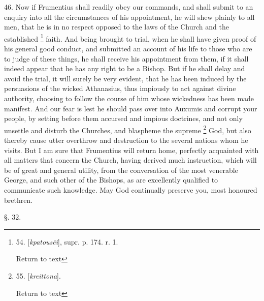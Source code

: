 46. Now if Frumentius shall readily obey our commands, and shall submit
to an enquiry into all the circumstances of his appointment, he will
shew plainly to all men, that he is in no respect opposed to the laws
of the Church and the established \footnote{54. [\emph{kpatous\={e}i}],
supr. p. 174. r. 1.

Return to text} faith. And being brought to trial, when he shall have given
proof of his general good conduct, and submitted an account of his
life to those who are to judge of these things, he shall receive his
appointment from them, if it shall indeed appear that he has any right
to be a Bishop. But if he shall delay and avoid the trial, it will
surely be very evident, that he has been induced by the persuasions of
the wicked Athanasius, thus impiously to act against divine authority,
choosing to follow the course of him whose wickedness has been made
manifest. And our fear is lest he should pass over into Auxumis and
corrupt your people, by setting before them accursed and impious
doctrines, and not only unsettle and disturb the Churches, and
blaspheme the supreme \footnote{55. [\emph{kreittona}].

Return to text}
God, but also thereby cause utter overthrow and destruction to the
several nations whom he visits. But I am sure that Frumentius will
return home, perfectly acquainted with all matters that concern the
Church, having derived much instruction, which will be of great and
general utility, from the conversation of the most venerable George,
and such other of the Bishops, as are excellently qualified to
communicate such knowledge. May God continually preserve you, most
honoured brethren.

§. 32.

